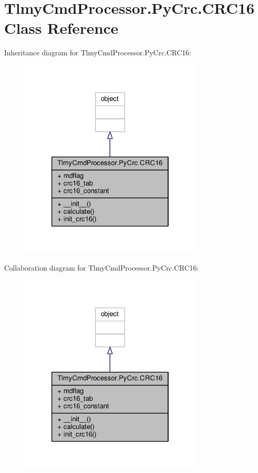 \hypertarget{class_tlmy_cmd_processor_1_1_py_crc_1_1_c_r_c16}{}\section{Tlmy\+Cmd\+Processor.\+Py\+Crc.\+C\+R\+C16 Class Reference}
\label{class_tlmy_cmd_processor_1_1_py_crc_1_1_c_r_c16}


Inheritance diagram for Tlmy\+Cmd\+Processor.\+Py\+Crc.\+C\+R\+C16\+:\nopagebreak
\begin{figure}[H]
\begin{center}
\leavevmode
\includegraphics[width=250pt]{class_tlmy_cmd_processor_1_1_py_crc_1_1_c_r_c16__inherit__graph}
\end{center}
\end{figure}


Collaboration diagram for Tlmy\+Cmd\+Processor.\+Py\+Crc.\+C\+R\+C16\+:\nopagebreak
\begin{figure}[H]
\begin{center}
\leavevmode
\includegraphics[width=250pt]{class_tlmy_cmd_processor_1_1_py_crc_1_1_c_r_c16__coll__graph}
\end{center}
\end{figure}
